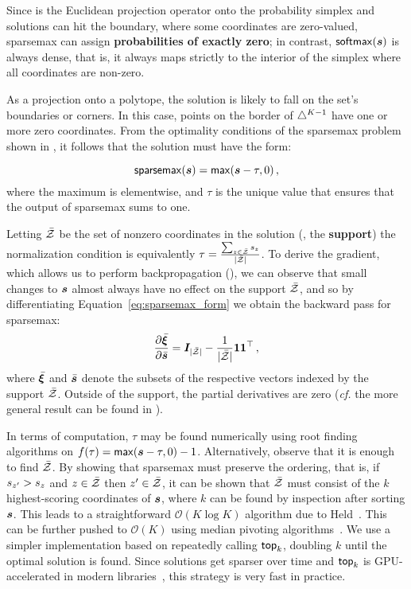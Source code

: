 Since
 is the Euclidean projection operator onto the probability
simplex and solutions can hit the boundary, where some coordinates are zero-valued, sparsemax can assign {\bf
        probabilities of exactly zero}; in contrast, $\softmax(\s)$
is always dense, that is, it always maps strictly
to the interior of the simplex where all coordinates are non-zero.

As a projection onto a polytope, the solution is likely to fall on the
set's boundaries or corners. In this case, points on the border of
$\simplex^{K-1}$ have one or more zero coordinates.
From the optimality conditions of the sparsemax problem shown in ,
it follows that the solution must have the form:

\begin{lemma}
    \begin{equation}\label{eq:sparsemax_form}
        \sparsemax(\s) = \max(\s - \tau, 0)\,,
    \end{equation}
    where the maximum is elementwise, and $\tau$ is the unique value that
    ensures that the output of sparsemax sums to one.
\end{lemma}

Letting $\bar{\ZZ}$ be the set of
nonzero coordinates in the solution (\ie, the \textbf{support}) the
normalization condition is equivalently $\tau = \frac{\sum_{z \in
            \bar{\ZZ}} \ss_z}{|\bar{\ZZ}|}$.
To derive the gradient, which allows us to perform backpropagation
(), we can observe that small changes to $\s$ almost always have no effect on the support
$\bar{\ZZ}$, and so by differentiating Equation~\ref{eq:sparsemax_form} we obtain the backward pass for sparsemax:
\begin{equation}
    \pfrac{\bar{\pv}}{\bar{\s}} = \bm{I}_{|\bar{\ZZ}|} - \frac{1}{|\bar{\ZZ}|}
    \bm{11}^\top\,,
\end{equation}
where $\bar{\pv}$ and ${\bar{\s}}$ denote the subsets of the respective vectors
indexed by the support $\bar{\ZZ}$. Outside of the support, the partial
derivatives are zero (\emph{cf.} the more general result can be found in \citet[Proposition
    2]{entmax}).

In terms of computation, $\tau$ may be found numerically using root finding
algorithms on $f(\tau) = \max(\s - \tau, 0) - 1$.
Alternatively, observe that it is enough to find $\bar{\ZZ}$. By showing that
sparsemax must preserve the ordering, that is, if $\ss_{z'} > \ss_z$ and $z \in
    \bar{\ZZ}$ then $z' \in \bar{\ZZ}$, it can be shown that $\bar{\ZZ}$ must
consist of the $k$ highest-scoring coordinates of $\s$, where $k$ can be found by
inspection after sorting $\s$. This leads to a straightforward $\mathcal{O}(K
    \log K)$ algorithm due to Held~\citep[pp.~16--17]{Held1974}. This can be further pushed to
$\mathcal{O}(K)$ using median pivoting algorithms~\citep{Condat2016, entmax}. We use
a simpler implementation based on repeatedly calling $\topk$,
doubling $k$ until the optimal solution is found. Since solutions get sparser
over time and $\topk$ is GPU-accelerated
in modern libraries~\citep{pytorch}, this strategy is very fast in practice.


